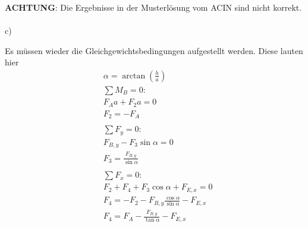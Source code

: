 \textbf{ACHTUNG}: Die Ergebnisse in der Musterlösung vom ACIN sind nicht korrekt.\\ \\
c)

\newpage
Es müssen wieder die Gleichgewichtsbedingungen aufgestellt werden. Diese lauten hier
\begin{align*}
	&\alpha = \arctan\left(\frac{h}{a}\right) \\
	&\sum M_B = 0: \\
	&F_Aa + F_2 a = 0 \\
	&F_2 = -F_A \\
	\\
	&\sum F_y = 0: \\
	&F_{B,y} - F_3 \sin\alpha = 0 \\
	&F_3 = \frac{F_{B,y}}{\sin\alpha} \\
	\\
	&\sum F_x = 0: \\
	&F_2 + F_4 + F_3 \cos\alpha + F_{E,x}= 0 \\
	&F_4 = - F_2 - F_{B,y}\frac{\cos\alpha}{\sin\alpha} - F_{E,x}\\
	&F_4 = F_A - \frac{F_{B,y}}{\tan\alpha} - F_{E,x}
\end{align*}